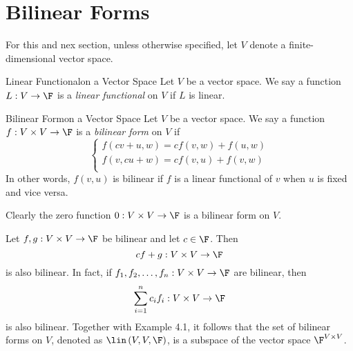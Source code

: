 \documentclass[linearalgebraII]{subfiles}
\begin{document}

    \section{Bilinear Forms}

    \begin{remark}
        For this and nex section, unless otherwise specified, let $V$ denote a finite-dimensional vector space.
    \end{remark}

    \begin{recall}{Linear Functional}{on a Vector Space}
        Let $V$ be a vector space. We say a function $L:V\to\F$ is a \emph{linear functional} on $V$ if $L$ is linear.
    \end{recall}

    \begin{definition}{Bilinear Form}{on a Vector Space}
        Let $V$ be a vector space. We say a function $f:V\times V\to\F$ is a \emph{bilinear form} on $V$ if
        \begin{equation*}
            \begin{cases}
                f(cv+u,w) = cf(v,w)+f(u,w) \\
                f(v,cu+w) = cf(v,u)+f(v,w) \\
            \end{cases}
        \end{equation*}
        In other words, $f(v,u)$ is bilinear if $f$ is a linear functional of $v$ when $u$ is fixed and vice versa.
    \end{definition}

    \begin{example}
        Clearly the zero function $0:V\times V\to \F$ is a bilinear form on $V$.
    \end{example}

    \begin{remark}
        Let $f,g:V\times V\to\F$ be bilinear and let $c\in\F$. Then
        \begin{equation*}
            cf+g:V\times V\to\F
        \end{equation*}
        is also bilinear. In fact, if $f_1,f_2,\ldots,f_n: V\times V\to\F$ are bilinear, then
        \begin{equation*}
            \sum^{n}_{i=1} c_if_i: V\times V\to\F 
        \end{equation*}
        is also bilinear. Together with Example 4.1, it follows that the set of bilinear forms on $V$, denoted as $\lin\left( V,V,\F \right)$, is a subspace of the vector space $\F^{V\times V}$.
    \end{remark}
\end{document}
